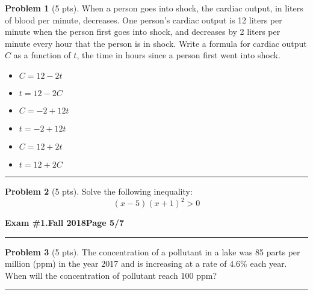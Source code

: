 \documentclass[12pt]{article}
\makeatletter
\theoremstyle{definition}
\newtheorem{problem}{Problem}
\newcommand*{\radiobutton}{%
  \@ifstar{\@radiobutton0}{\@radiobutton1}%
}
\newcommand*{\@radiobutton}[1]{%
  \begin{tikzpicture}
    \pgfmathsetlengthmacro\radius{height("X")/2}
    \draw[radius=\radius] circle;
    \ifcase#1 \fill[radius=.6*\radius] circle;\fi
  \end{tikzpicture}%
}
\makeatother
\begin{document}
\begin{problem}[5 pts]
  When a person goes into shock, the cardiac output, in liters of blood per minute, decreases. One person’s cardiac output
  is 12 liters per minute when the person first goes into shock, and decreases by 2 liters per minute every hour that the
  person is in shock. Write a formula for cardiac output $C$ as a function of $t$, the time in hours since a person first
  went into shock. 
  \begin{itemize}
  \item[\radiobutton] $C = 12 - 2t$
  \item[\radiobutton] $t = 12 - 2C$
  \item[\radiobutton] $C = -2 + 12t$
  \item[\radiobutton] $t = -2 + 12t$
  \item[\radiobutton] $C = 12 + 2t$
  \item[\radiobutton] $t = 12 + 2C$
  \end{itemize}
\end{problem}
\hrule

\begin{problem}[5 pts]
  Solve the following inequality:
  \begin{equation*} (x-5)(x+1)^2 > 0 \end{equation*}
\end{problem}

\newpage

\hfill{\large\bf Exam \#1.}\hfill{\large\bf  Fall 2018}\hfill{\large\bf Page 5/7}\hrule

\bigskip

\begin{problem}[5 pts]
  The concentration of a pollutant in a lake was 85 parts per million (ppm) in the year 2017 and is increasing at a rate of 4.6\% each
  year.  When will the concentration of pollutant reach 100 ppm?

  \vspace{8cm}

\end{problem}
\hrule
\end{document}
